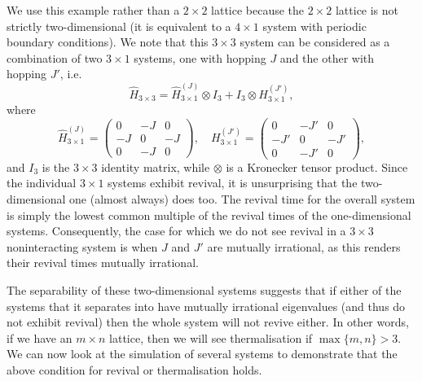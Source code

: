 \documentclass[a4paper, 10pt]{article}
\theoremstyle{plain}
\begin{document}
We use this example rather than a $2 \times 2$ lattice because the $2 \times 2$
lattice is not strictly two-dimensional (it is equivalent to a $4 \times 1$
system with periodic boundary conditions). We note that this $3 \times 3$ system
can be considered as a combination of two $3 \times 1$ systems, one with hopping
$J$ and the other with hopping $J'$, i.e.
\begin{equation}
 \hat{H}_{3 \times 3}
 =
 \hat{H}_{3 \times 1}^{(J)} \otimes {I}_{3}  +
 {I}_{3} \otimes H_{3 \times 1}^{(J')},
\end{equation}
where
\begin{equation}
    \hat{H}_{3\times1}^{(J)}
    =
    \begin{pmatrix}
         0 & -J &  0 \\
        -J &  0 & -J \\
         0 & -J &  0
    \end{pmatrix},
    \quad
    H_{3\times1}^{(J')}
    =
    \begin{pmatrix}
         0 & -J' &  0  \\
        -J' &  0 & -J' \\
         0 & -J' &  0
    \end{pmatrix},
\end{equation}
and $I_{3}$ is the $3 \times 3$ identity matrix, while $\otimes$ is a Kronecker
tensor product. Since the individual $3 \times 1$ systems exhibit revival, it is
unsurprising that the two-dimensional one (almost always) does too. The revival
time for the overall system is simply the lowest common multiple of the revival
times of the one-dimensional systems. Consequently, the case for which we do
not see revival in a $3\times3$ noninteracting system is when $J$ and $J'$ are
mutually irrational, as this renders their revival times mutually irrational.

The separability of these two-dimensional systems
suggests that if either of the systems that it separates into have mutually
irrational eigenvalues (and thus do not exhibit revival) then the whole system
will not revive either. In other words, if we have an $m \times n$ lattice, then
we will see thermalisation if $\max{\lbrace m,n \rbrace} > 3$. We can now look
at the simulation of several systems to demonstrate that the above condition for
revival or thermalisation holds.
\end{document}
